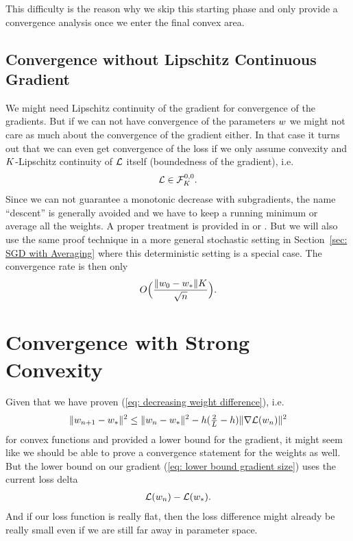 This difficulty is the reason why we skip this starting phase and only
provide a convergence analysis once we enter the final convex area.

\subsection{Convergence without Lipschitz Continuous Gradient}\label{subsec: subgradient method}

We might need Lipschitz continuity of the gradient for convergence of the
gradients. But if we can not have convergence of the parameters \(\weights\) we
might not care as much about the convergence of the gradient either. In that
case it turns out that we can even get convergence of the loss if we only assume
convexity and \(\lipConst\)-Lipschitz continuity of \(\Loss\) itself
(boundedness of the gradient), i.e.
\begin{align*}
	\Loss \in \lipGradientSet[0,0]{\lipConst}.
\end{align*}
%
Since we can not guarantee a monotonic decrease with subgradients, the name
``descent'' is generally avoided and we have to keep a running minimum or
average all the weights. A proper treatment is provided in \textcite[Section
2.2.3]{nesterovLecturesConvexOptimization2018} or \textcite[Section
2.1]{bubeckConvexOptimizationAlgorithms2015}. But we will also use the same proof
technique in a more general stochastic setting in Section~\ref{sec: SGD with
Averaging} where this deterministic setting is a special case. The convergence
rate is then only
\begin{align*}
	O\Big(\frac{\|\weights_0-\weights_*\|\lipConst}{\sqrt{n}}\Big).
\end{align*}

\section{Convergence with Strong Convexity}\label{sec: Strong Convexity}

Given that we have proven (\ref{eq: decreasing weight difference}), i.e.
\begin{align}\label{eq: weight iteration}
	\|\weights_{n+1}-\minimum\|^2
	\le \|\weights_n - \minimum\|^2 - \lr(\tfrac2{\ubound} -\lr)\|\nabla\Loss(\weights_n)\|^2
\end{align}
for convex functions and provided a lower bound for the gradient, it might seem
like we should be able to prove a convergence statement for the weights as
well. But the lower bound on our gradient (\ref{eq: lower bound gradient size})
uses the current loss delta
\begin{align*}
	\Loss(\weights_n)	- \Loss(\minimum).
\end{align*}
And if our loss function is really flat, then the loss difference might already
be really small even if we are still far away in parameter space.


